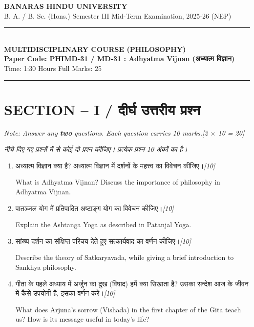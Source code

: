 \documentclass[11pt,a4paper]{article}
\newcommand{\pts}[1]{\hfill \textit{[#1]}}
\begin{document}
\begin{center}
  {\large\bfseries BANARAS HINDU UNIVERSITY}\\[2pt]
  {\normalsize B. A. / B. Sc. (Hons.) Semester III Mid-Term Examination, 2025-26 (NEP)}\\[6pt]
  \rule{0.8\linewidth}{0.5pt}\\[6pt]
  {\large\bfseries MULTIDISCIPLINARY COURSE (PHILOSOPHY)}\\[4pt]
  {\large\bfseries Paper Code: PHIMD-31 / MD-31 : Adhyatma Vijnan (अध्यात्म विज्ञान)}\\[4pt]
  {\normalsize Time: 1:30 Hours \hfill Full Marks: 25}
\end{center}
\rule{\linewidth}{0.4pt}
\smallskip

\section*{SECTION -- I / दीर्घ उत्तरीय प्रश्न}
\noindent \textit{Note: Answer any \textbf{two} questions. Each question carries 10 marks.}\pts{2 $\times$ 10 = 20}

\noindent \textit{नीचे दिए गए प्रश्नों में से कोई दो प्रश्न कीजिए। प्रत्येक प्रश्न 10 अंकों का है।}

\bigskip

\begin{enumerate}[label=\textbf{\arabic*.},leftmargin=*,itemsep=14pt]

  \item अध्यात्म विज्ञान क्या है? अध्यात्म विज्ञान में दर्शनों के महत्त्व का विवेचन कीजिए।\pts{10}
  
  What is Adhyatma Vijnan? Discuss the importance of philosophy in Adhyatma Vijnan.

  \item पातञ्जल योग में प्रतिपादित अष्टाङ्ग योग का विवेचन कीजिए।\pts{10}
  
  Explain the Ashtanga Yoga as described in Patanjal Yoga.

  \item सांख्य दर्शन का संक्षिप्त परिचय देते हुए सत्कार्यवाद का वर्णन कीजिए।\pts{10}
  
  Describe the theory of Satkaryavada, while giving a brief introduction to Sankhya philosophy.

  \item गीता के पहले अध्याय में अर्जुन का दुख (विषाद) हमें क्या सिखाता है? उसका सन्देश आज के जीवन में कैसे उपयोगी है, इसका वर्णन करें।\pts{10}
  
  What does Arjuna's sorrow (Vishada) in the first chapter of the Gita teach us? How is its message useful in today's life?

\end{enumerate}
\end{document}
